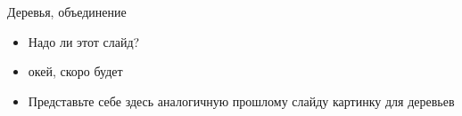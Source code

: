 \begin{frame}{Деревья, объединение}
  \begin{itemize}
  \item Надо ли этот слайд?
  \item окей, скоро будет
  \item Представьте себе здесь аналогичную прошлому слайду картинку
    для деревьев
  \end{itemize}
\end{frame}

